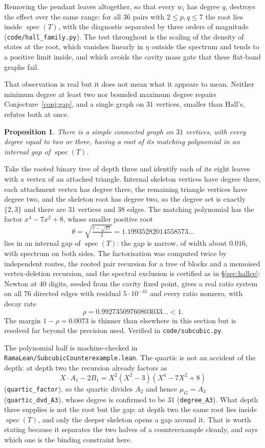 \documentclass[11pt]{article}
\newtheorem{proposition}[theorem]{Proposition}
\theoremstyle{remark}
\begin{document}
Removing the pendant leaves altogether, so that every $w_i$ has degree $q$, destroys the
effect over the same range: for all $36$ pairs with $2\le p,q\le7$ the root lies inside
$\operatorname{spec}(T)$, with the diagnostic separated by three orders of magnitude
(\texttt{code/hall\_family.py}). The test throughout is the scaling of the density of states
at the root, which vanishes linearly in $\eta$ outside the spectrum and tends to a positive
limit inside, and which avoids the cavity mass gate that these flat-band graphs fail.

That observation is real but it does not mean what it appears to mean. Neither minimum
degree at least two nor bounded maximum degree repairs Conjecture~\ref{conj:gap}, and a
single graph on $31$ vertices, smaller than Hall's, refutes both at once.

\begin{proposition}\label{prop:subcubic}
There is a simple connected graph on $31$ vertices, with every degree equal to two or three,
having a root of its matching polynomial in an internal gap of $\operatorname{spec}(T)$.
\end{proposition}

Take the rooted binary tree of depth three and identify each of its eight leaves with a
vertex of an attached triangle. Internal skeleton vertices have degree three, each attachment
vertex has degree three, the remaining triangle vertices have degree two, and the skeleton
root has degree two, so the degree set is exactly $\{2,3\}$ and there are $31$ vertices and
$38$ edges. The matching polynomial has the factor $x^4-7x^2+8$, whose smaller positive root
\[
   \theta=\sqrt{\tfrac{7-\sqrt{17}}{2}}=1.19935282014558573\ldots
\]
lies in an internal gap of $\operatorname{spec}(T)$: the gap is narrow, of width about
$0.016$, with spectrum on both sides. The factorisation was computed twice by independent
routes, the rooted pair recursion for a tree of blocks and a memoised vertex-deletion
recursion, and the spectral exclusion is certified as in \S\ref{sec:hallce}: Newton at $40$
digits, seeded from the cavity fixed point, gives a real ratio system on all $76$ directed
edges with residual $5\cdot10^{-41}$ and every ratio nonzero, with decay rate
\[
   \rho=0.99273509760803033\ldots<1 .
\]
The margin $1-\rho=0.0073$ is thinner than elsewhere in this section but is resolved far
beyond the precision used. Verified in \texttt{code/subcubic.py}.

The polynomial half is machine-checked in \texttt{RamaLean/SubcubicCounterexample.lean}. The
quartic is not an accident of the depth: at depth two the recursion already factors as
\[
   X\!\cdot\!A_1-2B_1=X^2(X^2-3)(X^4-7X^2+8)
\]
(\texttt{quartic\_factor}), so the quartic divides $A_2$ and hence $\mu_G=A_3$
(\texttt{quartic\_dvd\_A3}), whose degree is confirmed to be $31$
(\texttt{degree\_A3}). What depth three supplies is not the root but the gap: at depth two the
same root lies inside $\operatorname{spec}(T)$, and only the deeper skeleton opens a gap
around it. That is worth stating because it separates the two halves of a counterexample
cleanly, and says which one is the binding constraint here.
\end{document}
